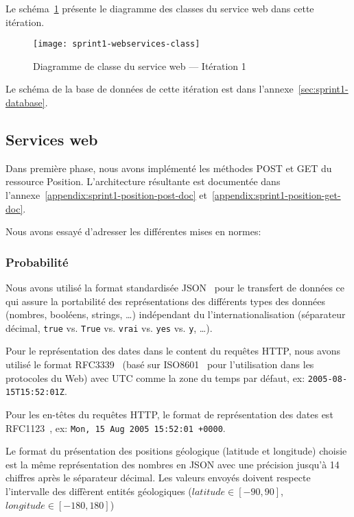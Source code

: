 Le schéma~\ref{fig:sprint1-webservices-class} présente le diagramme des classes
du service web dans cette itération.

\begin{figure}[H]
    \centering
    \texttt{[image: sprint1-webservices-class]}
    \caption{Diagramme de classe du service web --- Itération 1}
\label{fig:sprint1-webservices-class}
\end{figure}

Le schéma de la base de données de cette itération est dans
l'annexe~\ref{sec:sprint1-database}.

\subsection{Services web}

Dans première phase, nous avons implémenté les méthodes POST et GET du
ressource Position. L'architecture résultante est documentée dans
l'annexe~\ref{appendix:sprint1-position-post-doc}
et~\ref{appendix:sprint1-position-get-doc}.

Nous avons essayé d'adresser les différentes mises en normes:

\subsubsection{Probabilité}

Nous avons utilisé la format standardisée JSON~\cite{ECMA-404} pour le
transfert de données ce qui assure la portabilité des représentations des
différents types des données (nombres, booléens, strings, \ldots) indépendant
du l'internationalisation (séparateur décimal, \verb|true| vs. \verb|True| vs.
\verb|vrai| vs. \verb|yes| vs. \verb|y|, \ldots).

Pour le représentation des dates dans le content du requêtes HTTP, nous avons
utilisé le format RFC3339~\cite{RFC3339} (basé sur ISO8601~\cite{ISO8601} pour
l'utilisation dans les protocoles du Web) avec UTC comme la zone du temps par
défaut, ex: \verb|2005-08-15T15:52:01Z|.

Pour les en-têtes du requêtes HTTP, le format de représentation des dates est
RFC1123~\cite{RFC1123}, ex: \verb|Mon, 15 Aug 2005 15:52:01 +0000|.

Le format du présentation des positions géologique (latitude et longitude)
choisie est la même représentation des nombres en JSON avec une précision
jusqu'à 14 chiffres après le séparateur décimal. Les valeurs envoyés doivent
respecte l'intervalle des diffèrent entités géologiques ($latitude \in [-90,
90]$, $longitude \in [-180, 180]$)

